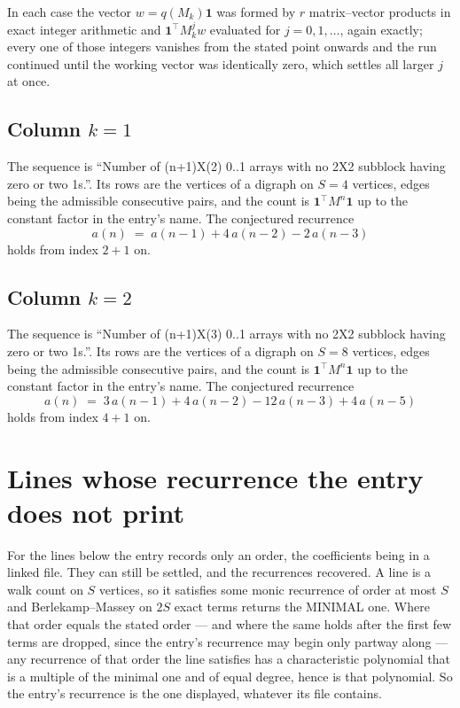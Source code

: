 \documentclass[11pt,a4paper]{article}
\theoremstyle{plain}
\theoremstyle{definition}
\begin{document}
In each case the vector $w=q(M_k)\mathbf{1}$ was formed by $r$ matrix--vector products in
exact integer arithmetic and $\mathbf{1}^{\!\top}M_k^{j}w$ evaluated for $j=0,1,\dots$,
again exactly; every one of those integers vanishes from the stated point onwards and the run
continued until the working vector was identically zero, which settles all larger $j$ at once.

\subsection*{Column $k$$=1$}
The sequence is ``Number of (n+1)X(2) 0..1 arrays with no 2X2 subblock having zero or two 1s.''. Its rows are the vertices of a digraph on
$S=4$ vertices, edges being the admissible consecutive pairs, and the count is
$\mathbf{1}^{\!\top}M^{n}\mathbf{1}$ up to the constant factor in the entry's name.
The conjectured recurrence
\[
a(n)\;=\;a(n-1) + 4\,a(n-2) - 2\,a(n-3)
\]
holds from index $2+1$ on.

\subsection*{Column $k$$=2$}
The sequence is ``Number of (n+1)X(3) 0..1 arrays with no 2X2 subblock having zero or two 1s.''. Its rows are the vertices of a digraph on
$S=8$ vertices, edges being the admissible consecutive pairs, and the count is
$\mathbf{1}^{\!\top}M^{n}\mathbf{1}$ up to the constant factor in the entry's name.
The conjectured recurrence
\[
a(n)\;=\;3\,a(n-1) + 4\,a(n-2) - 12\,a(n-3) + 4\,a(n-5)
\]
holds from index $4+1$ on.


\section{Lines whose recurrence the entry does not print}

For the lines below the entry records only an order, the coefficients being in a linked file.
They can still be settled, and the recurrences recovered. A line is a walk count on $S$
vertices, so it satisfies some monic recurrence of order at most $S$ and Berlekamp--Massey on
$2S$ exact terms returns the MINIMAL one. Where that order equals the stated order --- and
where the same holds after the first few terms are dropped, since the entry's recurrence may
begin only partway along --- any recurrence of that order the line satisfies has a
characteristic polynomial that is a multiple of the minimal one and of equal degree, hence is
that polynomial. So the entry's recurrence is the one displayed, whatever its file contains.
\end{document}
